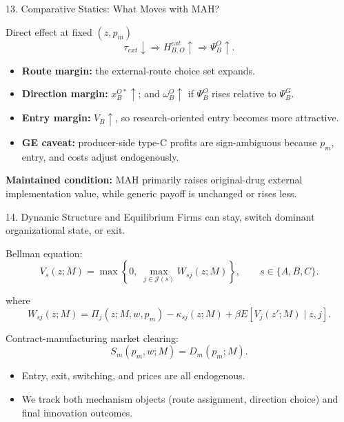 \documentclass[aspectratio=169,11pt]{beamer}
\begin{document}
\begin{frame}{13. Comparative Statics: What Moves with MAH?}
\small
\begin{block}{Direct effect at fixed \((z,p_m)\)}
\[
\tau_{ext}\downarrow
\Rightarrow
H_{B,O}^{ext}\uparrow
\Rightarrow
\Psi_B^O\uparrow.
\]
\end{block}

\begin{itemize}
    \item \textbf{Route margin:} the external-route choice set expands.
    \item \textbf{Direction margin:} \(x_B^{O*}\uparrow\); and \(\omega_B^O\uparrow\) if \(\Psi_B^O\) rises relative to \(\Psi_B^G\).
    \item \textbf{Entry margin:} \(V_B\uparrow\), so research-oriented entry becomes more attractive.
    \item \textbf{GE caveat:} producer-side type-C profits are sign-ambiguous because \(p_m\), entry, and costs adjust endogenously.
\end{itemize}

\vspace{0.1cm}
\textbf{Maintained condition:} MAH primarily raises original-drug external implementation value, while generic payoff is unchanged or rises less.
\end{frame}

\begin{frame}{14. Dynamic Structure and Equilibrium}
\small
Firms can stay, switch dominant organizational state, or exit.

Bellman equation:
\[
V_s(z;M)=
\max\left\{
0,\;
\max_{j\in\mathcal{J}(s)}
W_{sj}(z;M)
\right\},
\qquad s\in\{A,B,C\}.
\]

where
\[
W_{sj}(z;M)=
\Pi_j(z;M,w,p_m)
-\kappa_{sj}(z;M)
+\beta E[V_j(z';M)\mid z,j].
\]

Contract-manufacturing market clearing:
\[
S_m(p_m,w;M)=D_m(p_m;M).
\]

\begin{itemize}
    \item Entry, exit, switching, and prices are all endogenous.
    \item We track both mechanism objects (route assignment, direction choice) and final innovation outcomes.
\end{itemize}
\end{frame}
\end{document}
